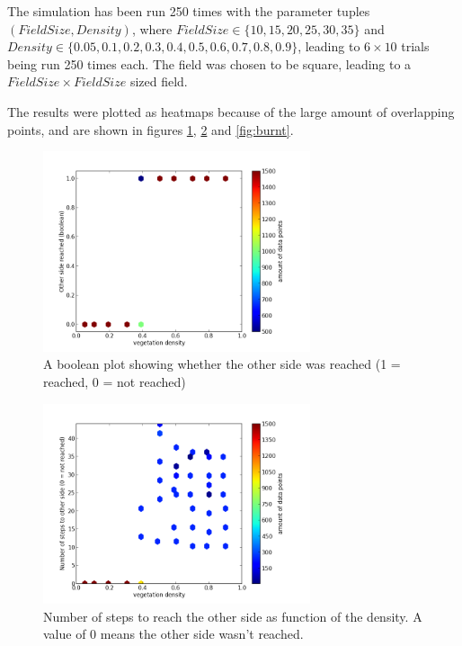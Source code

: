 \documentclass[a4paper]{report}
\begin{document}
The simulation has been run 250 times with the parameter tuples $(FieldSize,
Density)$, where $FieldSize \in \{10, 15, 20, 25, 30, 35\}$ and \\
$Density \in \{0.05, 0.1, 0.2, 0.3, 0.4, 0.5, 0.6, 0.7, 0.8, 0.9\}$, leading to
$6 \times 10$ trials being run 250 times each. The field
was chosen to be square, leading to a $FieldSize \times FieldSize$ sized field.

The results were plotted as heatmaps because of the large amount of overlapping
points, and are shown in figures \ref{fig:reached}, \ref{fig:steps} and
\ref{fig:burnt}.

\begin{figure}[htbp]
    \centering
    \includegraphics[width=0.7\textwidth]{./density_vs_reached.png}
    \caption{A boolean plot showing whether the other side was reached (1 =
             reached, 0 = not reached)}
    \label{fig:reached}
\end{figure}

\begin{figure}[htbp]
    \centering
    \includegraphics[width=0.7\textwidth]{./density_vs_steps.png}
    \caption{Number of steps to reach the other side as function of the density.
             A value of 0 means the other side wasn't reached.}
    \label{fig:steps}
\end{figure}
\end{document}
